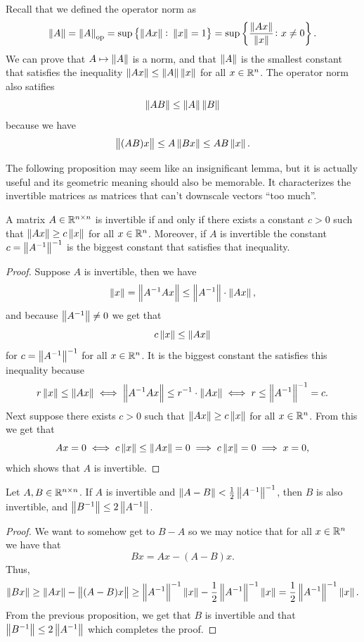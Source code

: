 \documentclass[11pt,a4paper]{article}
\begin{document}
\begin{remark}
  Recall that we defined the operator norm as
  \[
    \left\lVert A\right\rVert = \left\lVert A\right\rVert_{\operatorname{op}} = \sup\left\{\left\lVert Ax\right\rVert \colon \left\lVert x\right\rVert = 1\right\} =
    \sup\left\{\frac{\left\lVert Ax\right\rVert}{\left\lVert x\right\rVert} \colon x \neq 0\right\}.
  \]
  We can prove that $A \mapsto \left\lVert A\right\rVert$ is a norm, and that $\left\lVert A\right\rVert$
  is the smallest constant that satisfies the inequality 
  $\left\lVert Ax\right\rVert \le \left\lVert A\right\rVert \left\lVert x\right\rVert$ for all $x \in \mathbb{R}^n$.
  The operator norm also satifies
  \[
    \left\lVert AB\right\rVert \le \left\lVert A\right\rVert \left\lVert B\right\rVert
  \]
  because we have
  \[
    \left\lVert(AB)x\right\rVert \le A \left\lVert Bx\right\rVert \le AB \left\lVert x\right\rVert.
  \]
\end{remark}

\begin{remark}
  The following proposition may seem like an insignificant lemma,
  but it is actually useful and its geometric meaning should also be
  memorable.
  It characterizes the invertible matrices as matrices
  that can't downscale vectors ``too much''.
\end{remark}
\begin{proposition}
  A matrix $A \in \mathbb{R}^{n \times n}$ is invertible if and only if there exists
  a constant $c > 0$ such that $\left\lVert Ax\right\rVert \geq c \left\lVert x\right\rVert$ for all $x \in \mathbb{R}^n$.
  Moreover, if $A$ is invertible the constant $c = \left\lVert A^{-1}\right\rVert^{-1}$
  is the biggest constant that satisfies that inequality.
\end{proposition}
\begin{proof}
  Suppose $A$ is invertible, then we have
  \[
    \left\lVert x\right\rVert = \left\lVert A^{-1} A x\right\rVert \le \left\lVert A^{-1}\right\rVert \cdot \left\lVert Ax\right\rVert,
  \]
  and because $\left\lVert A^{-1}\right\rVert \neq 0$ we get that
  \[
    c \left\lVert x\right\rVert \le \left\lVert Ax\right\rVert
  \]
  for $c = \left\lVert A^{-1}\right\rVert^{-1}$ for all $x \in \mathbb{R}^n$.
  It is the biggest constant the satisfies this inequality because
  \[
    r \left\lVert x\right\rVert \le \left\lVert Ax\right\rVert \iff
    \left\lVert A^{-1} A x\right\rVert \le r^{-1} \cdot \left\lVert Ax\right\rVert \iff
    r \le \left\lVert A^{-1}\right\rVert^{-1} = c.
  \]
  Next suppose there exists $c > 0$ such that $\left\lVert Ax\right\rVert \geq c \left\lVert x\right\rVert$ for all
  $x \in \mathbb{R}^n$.
  From this we get that
  \[
    Ax = 0 \iff
    c \left\lVert x\right\rVert \le \left\lVert Ax\right\rVert = 0
    \implies c \left\lVert x\right\rVert = 0
    \implies x = 0,
  \]
  which shows that $A$ is invertible.
\end{proof}

\begin{proposition}
  \label{prop:invertible-balls}
  Let $A,B \in \mathbb{R}^{n \times n}$.
  If $A$ is invertible and $\left\lVert A - B\right\rVert < \frac{1}{2} \left\lVert A^{-1}\right\rVert^{-1}$, then
  $B$ is also invertible, and $\left\lVert B^{-1}\right\rVert \le 2 \left\lVert A^{-1}\right\rVert$.
\end{proposition}
\begin{proof}
  We want to somehow get to $B - A$ so we may notice that
  for all $x \in \mathbb{R}^n$ we have that
  \[
    Bx = Ax - (A - B)x.
  \]
  Thus,
  \[
    \left\lVert Bx\right\rVert \geq \left\lVert Ax\right\rVert - \left\lVert(A - B)x\right\rVert \geq
    \left\lVert A^{-1}\right\rVert^{-1} \left\lVert x\right\rVert - \frac{1}{2} \left\lVert A^{-1}\right\rVert^{-1} \left\lVert x\right\rVert =
    \frac{1}{2} \left\lVert A^{-1}\right\rVert^{-1} \left\lVert x\right\rVert.
  \]
  From the previous proposition, we get that $B$ is invertible and that
  $\left\lVert B^{-1}\right\rVert \le 2 \left\lVert A^{-1}\right\rVert$ which completes the proof.
\end{proof}
\end{document}
